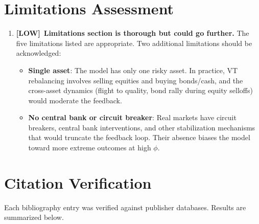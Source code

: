 \documentclass[12pt,a4paper]{article}
\newcommand{\LOW}{\textbf{\textcolor{lowgreen}{[LOW]}}}
\begin{document}
\section{Limitations Assessment}
\label{sec:limitations}

\begin{enumerate}[leftmargin=2em,resume]

\item \LOW\ \textbf{Limitations section is thorough but could go further.} The five limitations listed are appropriate. Two additional limitations should be acknowledged:
\begin{itemize}
  \item \textbf{Single asset}: The model has only one risky asset. In practice, VT rebalancing involves selling equities and buying bonds/cash, and the cross-asset dynamics (flight to quality, bond rally during equity selloffs) would moderate the feedback.
  \item \textbf{No central bank or circuit breaker}: Real markets have circuit breakers, central bank interventions, and other stabilization mechanisms that would truncate the feedback loop. Their absence biases the model toward more extreme outcomes at high $\phi$.
\end{itemize}

\end{enumerate}

\section{Citation Verification}
\label{sec:citations}

Each bibliography entry was verified against publisher databases. Results are summarized below.

\medskip
\end{document}
